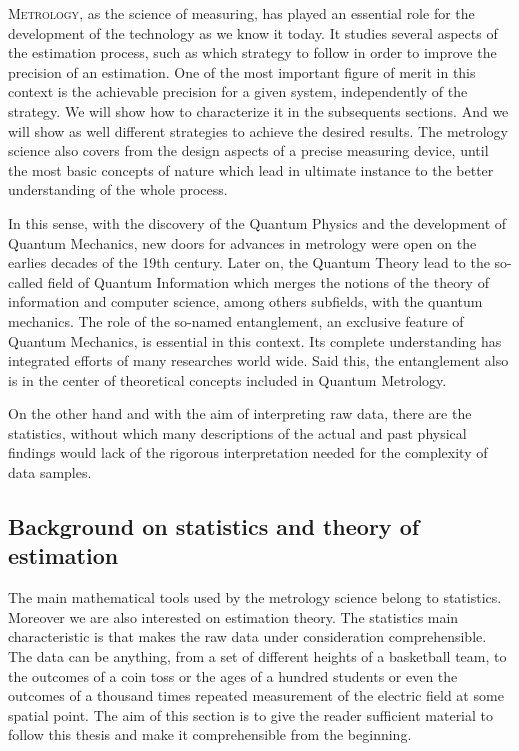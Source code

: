 \vspace{15pt}
\lettrine[lines=2, findent=3pt,nindent=0pt]{M}{etrology}, as the science of measuring, has played an essential role for the development of the technology as we know it today.
It studies several aspects of the estimation process, such as which strategy to follow in order to improve the precision of an estimation.
One of the most important figure of merit in this context is the achievable precision for a given system, independently of the strategy.
We will show how to characterize it in the subsequents sections.
And we will show as well different strategies to achieve the desired results.
The metrology science also covers from the design aspects of a precise measuring device, until the most basic concepts of nature which lead in ultimate instance to the better understanding of the whole process.

In this sense, with the discovery of the Quantum Physics and the development of Quantum Mechanics, new doors for advances in metrology were open on the earlies decades of the 19th century.
Later on, the Quantum Theory lead to the so-called field of Quantum Information which merges the notions of the theory of information and computer science, among others subfields, with the quantum mechanics.
The role of the so-named entanglement, an exclusive feature of Quantum Mechanics, is essential in this context.
Its complete understanding has integrated efforts of many researches world wide.
Said this, the entanglement also is in the center of theoretical concepts included in Quantum Metrology.

On the other hand and with the aim of interpreting raw data, there are the statistics, without which many descriptions of the actual and past physical findings would lack of the rigorous interpretation needed for the complexity of data samples.



\subsection{Background on statistics and theory of estimation}
The main mathematical tools used by the metrology science belong to statistics.
Moreover we are also interested on estimation theory.
The statistics main characteristic is that makes the raw data under consideration comprehensible.
The data can be anything, from a set of different heights of a basketball team, to the outcomes of a coin toss or the ages of a hundred students or even the outcomes of a thousand times repeated measurement of the electric field at some spatial point.
The aim of this section is to give the reader sufficient material to follow this thesis and make it comprehensible from the beginning.

